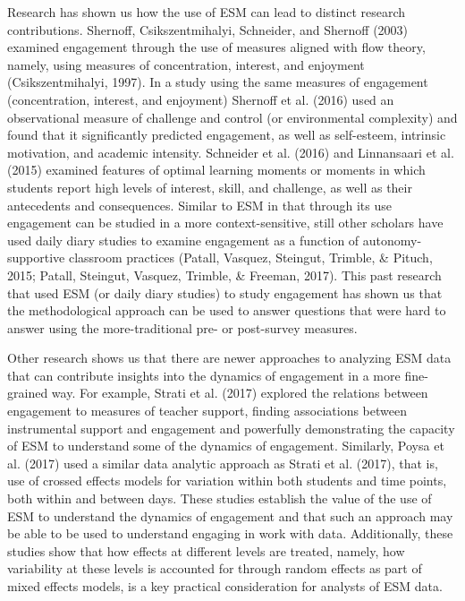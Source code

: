 \documentclass[]{msu-thesis}
\theoremstyle{definition}
\theoremstyle{definition}
\theoremstyle{definition}
\theoremstyle{remark}
\begin{document}
Research has shown us how the use of ESM can lead to distinct research
contributions. Shernoff, Csikszentmihalyi, Schneider, and Shernoff
(2003) examined engagement through the use of measures aligned with flow
theory, namely, using measures of concentration, interest, and enjoyment
(Csikszentmihalyi, 1997). In a study using the same measures of
engagement (concentration, interest, and enjoyment) Shernoff et al.
(2016) used an observational measure of challenge and control (or
environmental complexity) and found that it significantly predicted
engagement, as well as self-esteem, intrinsic motivation, and academic
intensity. Schneider et al. (2016) and Linnansaari et al. (2015)
examined features of optimal learning moments or moments in which
students report high levels of interest, skill, and challenge, as well
as their antecedents and consequences. Similar to ESM in that through
its use engagement can be studied in a more context-sensitive, still
other scholars have used daily diary studies to examine engagement as a
function of autonomy-supportive classroom practices (Patall, Vasquez,
Steingut, Trimble, \& Pituch, 2015; Patall, Steingut, Vasquez, Trimble,
\& Freeman, 2017). This past research that used ESM (or daily diary
studies) to study engagement has shown us that the methodological
approach can be used to answer questions that were hard to answer using
the more-traditional pre- or post-survey measures.

Other research shows us that there are newer approaches to analyzing ESM
data that can contribute insights into the dynamics of engagement in a
more fine-grained way. For example, Strati et al. (2017) explored the
relations between engagement to measures of teacher support, finding
associations between instrumental support and engagement and powerfully
demonstrating the capacity of ESM to understand some of the dynamics of
engagement. Similarly, Poysa et al. (2017) used a similar data analytic
approach as Strati et al. (2017), that is, use of crossed effects models
for variation within both students and time points, both within and
between days. These studies establish the value of the use of ESM to
understand the dynamics of engagement and that such an approach may be
able to be used to understand engaging in work with data. Additionally,
these studies show that how effects at different levels are treated,
namely, how variability at these levels is accounted for through random
effects as part of mixed effects models, is a key practical
consideration for analysts of ESM data.
\end{document}
